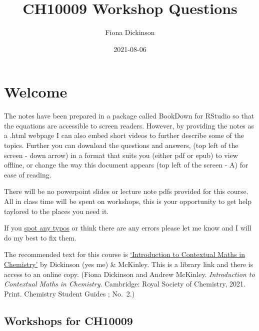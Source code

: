 \documentclass[
]{book}
\title{CH10009 Workshop Questions}
\author{Fiona Dickinson}
\date{2021-08-06}
\begin{document}
\maketitle

{
\setcounter{tocdepth}{1}
\tableofcontents
}
\hypertarget{welcome}{%
\chapter*{Welcome}\label{welcome}}

The notes have been prepared in a package called BookDown for RStudio so that the equations are accessible to screen readers. However, by providing the notes as a .html webpage I can also embed short videos to further describe some of the topics. Further you can download the questions and answers, (top left of the screen - down arrow) in a format that suits you (either pdf or epub) to view offline, or change the way this document appears (top left of the screen - A) for ease of reading.

There will be no powerpoint slides or lecture note pdfs provided for this course. All in class time will be spent on workshops, this is your opportunity to get help taylored to the places you need it.

If you \href{https://docs.google.com/forms/d/1hxCt8XcQ8taLXfymZfl2LUOjHACQ4INnRK6GeArTxsc/edit}{spot any typos} or think there are any errors please let me know and I will do my best to fix them.

The recommended text for this course is \href{https://bath-ac-primo.hosted.exlibrisgroup.com/primo-explore/fulldisplay?docid=44BAT_ALMA_DS51100784580002761\&context=L\&vid=44BAT_VU1\&lang=en_US\&search_scope=CSCOP_44BAT_DEEP\&adaptor=Local\%20Search\%20Engine\&tab=local\&query=any,contains,contextual\%20maths\%20in\%20chemistry\&sortby=rank\&pcAvailability=false}{`Introduction to Contextual Maths in Chemistry'} by Dickinson (yes me) \& McKinley. This is a library link and there is access to an online copy. (Fiona Dickinson and Andrew McKinley. \emph{Introduction to Contextual Maths in Chemistry}. Cambridge: Royal Society of Chemistry, 2021. Print. Chemistry Student Guides ; No.~2.)

\hypertarget{workshops-for-ch10009}{%
\section*{Workshops for CH10009}\label{workshops-for-ch10009}}
\end{document}
